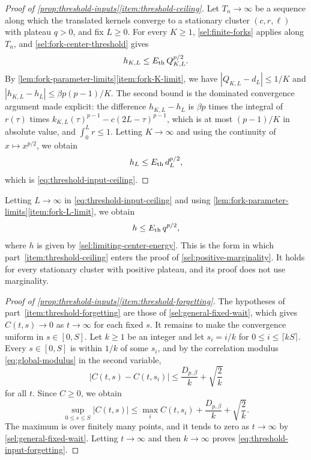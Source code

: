\begin{proof}[Proof of \cref{prop:threshold-inputs}\ref{item:threshold-ceiling}]
Let $T_n\to\infty$ be a sequence along which the translated kernels converge
to a stationary cluster $(c,r,\ell)$ with plateau $q>0$, and fix $L\ge0$.
For every $K\ge1$, \cref{sel:finite-forks} applies along $T_n$, and
\eqref{sel:fork-center-threshold} gives
\[
 h_{K,L}\le E_{\mathrm{th}}\,Q_{K,L}^{p/2}.
\]
By \cref{lem:fork-parameter-limits}\ref{item:fork-K-limit}, we have
$|Q_{K,L}-d_L|\le1/K$ and $|h_{K,L}-h_L|\le\beta p(p-1)/K$. The second bound
is the dominated convergence argument made explicit: the difference
$h_{K,L}-h_L$ is $\beta p$ times the integral of $r(\tau)$ times
$k_{K,L}(\tau)^{p-1}-c(2L-\tau)^{p-1}$, which is at most $(p-1)/K$ in absolute
value, and $\int_0^Lr\le1$. Letting $K\to\infty$ and using the continuity of
$x\mapsto x^{p/2}$, we obtain
\[
 h_L\le E_{\mathrm{th}}\,d_L^{p/2},
\]
which is \eqref{eq:threshold-input-ceiling}.
\end{proof}

Letting $L\to\infty$ in \eqref{eq:threshold-input-ceiling} and using
\cref{lem:fork-parameter-limits}\ref{item:fork-L-limit}, we obtain
\begin{equation}\label{sel:general-positive-upper-bound}
 h\le E_{\mathrm{th}}\,q^{p/2},
\end{equation}
where $h$ is given by \eqref{sel:limiting-center-energy}. This is the form
in which part~\ref{item:threshold-ceiling} enters the proof of
\cref{sel:positive-marginality}. It holds for every stationary cluster with
positive plateau, and its proof does not use marginality.

\begin{proof}[Proof of \cref{prop:threshold-inputs}\ref{item:threshold-forgetting}]
The hypotheses of part~\ref{item:threshold-forgetting} are those of
\cref{sel:general-fixed-wait}, which gives $C(t,s)\to0$ as $t\to\infty$ for
each fixed $s$. It remains to make the convergence uniform in
$s\in[0,S]$. Let $k\ge1$ be an integer and let $s_i=i/k$ for
$0\le i\le\lceil kS\rceil$. Every $s\in[0,S]$ is within $1/k$ of some
$s_i$, and by the correlation modulus \eqref{eq:global-modulus} in the
second variable,
\[
 |C(t,s)-C(t,s_i)|\le\frac{D_{p,\beta}}k+\sqrt{\frac2k}
\]
for all $t$. Since $C\ge0$, we obtain
\[
 \sup_{0\le s\le S}|C(t,s)|\le\max_{i}C(t,s_i)+\frac{D_{p,\beta}}k+\sqrt{\frac2k}.
\]
The maximum is over finitely many points, and it tends to zero as
$t\to\infty$ by \cref{sel:general-fixed-wait}. Letting $t\to\infty$ and then
$k\to\infty$ proves \eqref{eq:threshold-input-forgetting}.
\end{proof}
